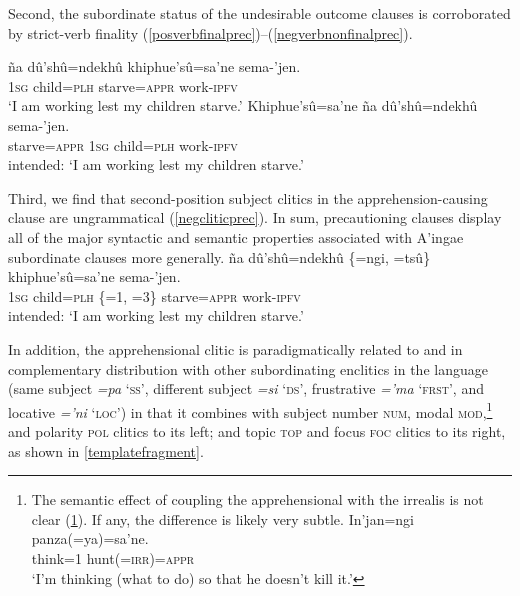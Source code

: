 \documentclass[output=paper,colorlinks,citecolor=brown]{langscibook}
\begin{document}
Second, the subordinate status of the undesirable outcome  clauses is corroborated by strict-verb finality (\ref{posverbfinalprec})--(\ref{negverbnonfinalprec}).
\begin{exe}
    \ex\label{posverbfinalprec}
    \gll {\ob}ña dû'shû=ndekhû {khiphue'sû=sa'ne{\cb}} sema-'jen.    \\
        \textsc{1sg} child=\textsc{plh}             {starve=\textsc{appr}}      work-\textsc{ipfv} \\
    \glt `I am working lest my children starve.'  
    \ex\label{negverbnonfinalprec}
    \gll \bad{\ob}Khiphue'sû=sa'ne ña {dû'shû=ndekhû{\cb}} sema-'jen.  \\
         starve=\textsc{appr}  \textsc{1sg}      {child=\textsc{plh}}           work-\textsc{ipfv} \\
    \glt intended: `I am working lest my children starve.'
\end{exe}

Third, we find that second-position subject clitics in the apprehension-causing clause are ungrammatical (\ref{negcliticprec}). In sum, precautioning  clauses display all of the major syntactic and semantic properties associated with A'ingae subordinate clauses more generally.
    \ea \label{negcliticprec}
    \gll \bad{\ob}ña dû'shû=ndekhû {\rm\{}=ngi, =tsû{\rm\}} {khiphue'sû=sa'ne{\cb}} sema-'jen.    \\
        \textsc{1sg} child=\textsc{plh} {\rm\{}\textsc{=}1, \textsc{=}3{\rm\}}   {starve=\textsc{appr}}      work-\textsc{ipfv} \\
    \glt intended: `I am working lest my children starve.'  
    \z

In addition, the apprehensional clitic  is paradigmatically related to and in complementary distribution with other subordinating enclitics in the language (same subject \emph{=pa} `\textsc{ss}', different subject \emph{=si} `\textsc{ds}', frustrative \emph{='ma} `\textsc{frst}', and locative \emph{='ni} `\textsc{loc}') in that it combines with subject number {\textsc{num},} modal {\textsc{mod},}\footnote{{The semantic effect of coupling the apprehensional  with the irrealis  is not clear (\ref{yasane}). If any, the difference is likely very subtle.}
    \ea \label{yasane}
    \gll In'jan=ngi panza\textup{(}=ya\textup{)}=sa'ne. \\
         think\textsc{=1} hunt(=\textsc{irr})\textsc{=appr}\\
    \glt `I'm thinking (what to do) so that he doesn't kill it.'
    \z 
} and polarity {\textsc{pol}} clitics to its left; and topic {\textsc{top}} and focus {\textsc{foc}} clitics to its right, as shown in \autoref{templatefragment}.
    
\end{document}
